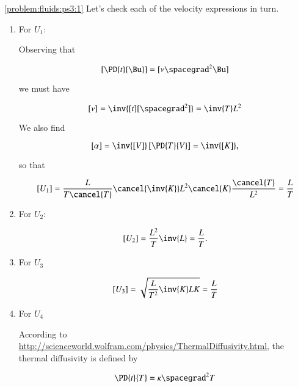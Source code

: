 \begin{Answer}[ref={problem:fluids:ps3}]
\ref{problem:fluids:ps3:1} Let's check each of the velocity expressions in turn.

\begin{enumerate}
\item For $U_1$:

Observing that 

\begin{equation}\label{eqn:continuumProblemSet3:10}
\left[ \PD{t}{\Bu} \right] = [ \nu \spacegrad^2 \Bu ]
\end{equation}

we must have

\begin{equation}\label{eqn:continuumProblemSet3:30}
[\nu] = \inv{[t] [\spacegrad^2]} = \inv{T} L^2
\end{equation}

We also find

\begin{equation}\label{eqn:continuumProblemSet3:50}
[\alpha] = \inv{[V]} \left[ \PD{T}{V} \right] = \inv{[K]},
\end{equation}

so that

\begin{equation}\label{eqn:continuumProblemSet3:70}
[U_1] = \frac{L}{T \cancel{T}} \cancel{\inv{K}} L^2 \cancel{K} \frac{\cancel{T}}{L^2} = \frac{L}{T}
\end{equation}

\item For $U_2$:

\begin{equation}\label{eqn:continuumProblemSet3:90}
[U_2] = \frac{L^2}{T} \inv{L} = \frac{L}{T}.
\end{equation}

\item For $U_3$

\begin{equation}\label{eqn:continuumProblemSet3:110}
[U_3] = \sqrt{ \frac{L}{T^2} \inv{K} L K } = \frac{L}{T}
\end{equation}

\item For $U_4$

According to \href{http://scienceworld.wolfram.com/physics/ThermalDiffusivity.html}{http://scienceworld.wolfram.com/physics/ThermalDiffusivity.html}, the thermal diffusivity is defined by

\begin{equation}\label{eqn:continuumProblemSet3:130}
\PD{t}{T} = \kappa \spacegrad^2 T
\end{equation}


\end{enumerate}
\end{Answer}
